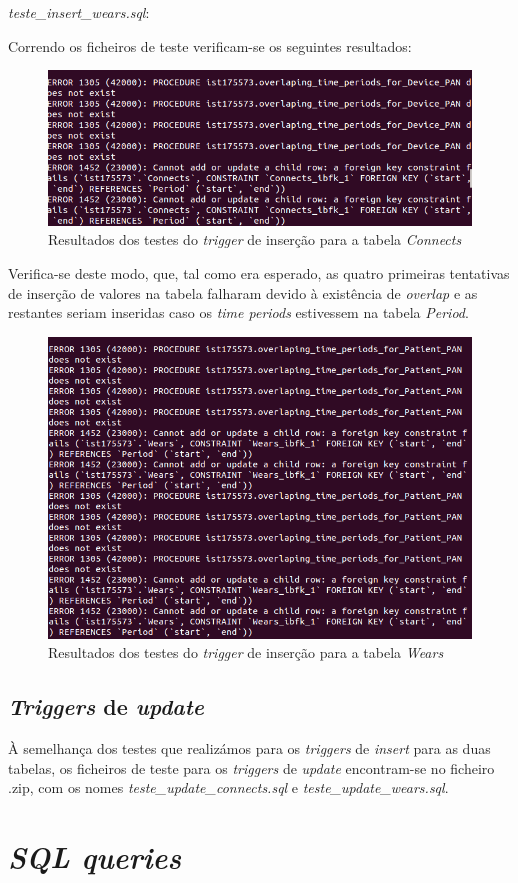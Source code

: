 \documentclass[a4paper]{article}
\begin{document}
\pagebreak
\textit{teste\_insert\_wears.sql}:


Correndo os ficheiros de teste verificam-se os seguintes resultados:

\begin{figure}[ht!]
\centering
\includegraphics[scale=0.7]{insert_connects.png}
\caption{Resultados dos testes do \textit{trigger} de inserção para a tabela \textit{Connects}}
\end{figure}

Verifica-se deste modo, que, tal como era esperado, as quatro primeiras tentativas de inserção de valores na tabela falharam devido à existência de \textit{overlap} e as restantes seriam inseridas caso os \textit{time periods} estivessem na tabela \textit{Period}.

\begin{figure}[ht!]
\centering
\includegraphics[scale=0.7]{insert_wears.png}
\caption{Resultados dos testes do \textit{trigger} de inserção para a tabela \textit{Wears}}
\end{figure}

\subsection{\textit{Triggers} de \textit{update}}
À semelhança dos testes que realizámos para os \textit{triggers} de \textit{insert} para as duas tabelas, os ficheiros de teste para os \textit{triggers} de \textit{update} encontram-se no ficheiro .zip, com os nomes \textit{teste\_update\_connects.sql} e \textit{teste\_update\_wears.sql}.

\section{\textit{SQL queries}}
\end{document}

